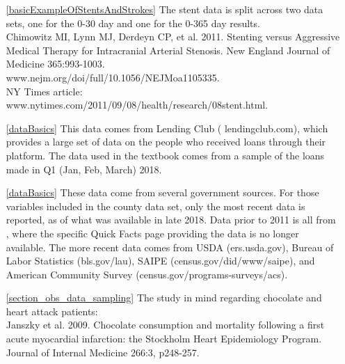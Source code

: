 \begin{itemize}
\item[\ref{basicExampleOfStentsAndStrokes}]
    The stent data is split across two data sets,
    one for the 0-30 day and one for the 0-365 day results. \\
    Chimowitz MI, Lynn MJ, Derdeyn CP, et al. 2011.
    Stenting versus Aggressive Medical Therapy for
    Intracranial Arterial Stenosis.
    New England Journal of Medicine 365:993-1003.\\
        {www.nejm.org/doi/full/10.1056/NEJMoa1105335}. \\
    NY Times article:
        {www.nytimes.com/2011/09/08/health/research/08stent.html}.

\item[\ref{dataBasics}]
    This data comes from Lending Club
    (
        {lendingclub.com}),
    which provides a large set of data on the people who
    received loans through their platform.
    The data used in the textbook comes from a sample
    of the loans made in Q1 (Jan, Feb, March) 2018.
\item[\ref{dataBasics}]
    These data come from several government sources.
    For those variables included in the
    county data set, only the most recent data is reported,
    as of what was available in late 2018.
    Data prior to 2011 is all from
    ,
    where the specific Quick Facts page providing the data
    is no longer available.
    The more recent data comes from
        {USDA (ers.usda.gov)},
        {Bureau of Labor Statistics (bls.gov/lau)},
        {SAIPE (census.gov/did/www/saipe)},
    and
        {American Community Survey
            (census.gov/programs-surveys/acs)}.

\item[\ref{section_obs_data_sampling}]
    The study in mind regarding chocolate and heart attack patients:\\
    Janszky et al. 2009.
        {Chocolate consumption and mortality following
        a first acute myocardial infarction: the Stockholm
        Heart Epidemiology Program}.
    Journal of Internal Medicine 266:3, p248-257.


\end{itemize}
